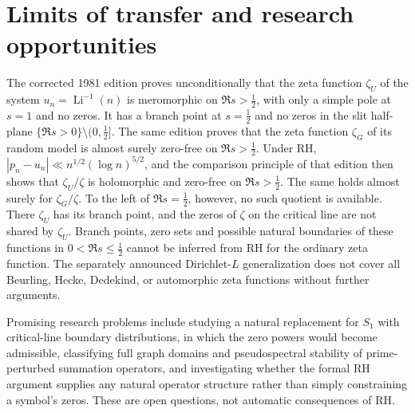 \documentclass[12pt,letterpaper]{article}
\numberwithin{equation}{section}
\theoremstyle{definition}
\begin{document}
\section{Limits of transfer and research opportunities}
The corrected 1981 edition proves unconditionally that the zeta function
$\zeta_U$ of the system $u_n=\operatorname{Li}^{-1}(n)$ is meromorphic on
$\Re s>\tfrac12$, with only a simple pole at $s=1$ and no zeros.  It has a
branch point at $s=\tfrac12$ and no zeros in the slit half-plane
$\{\Re s>0\}\setminus(0,\tfrac12]$.  The same edition proves that the zeta
function $\zeta_G$ of its random model is almost surely zero-free on
$\Re s>\tfrac12$.  Under RH, $|p_n-u_n|\ll n^{1/2}(\log n)^{5/2}$, and the
comparison principle of that edition then shows that $\zeta_U/\zeta$ is
holomorphic and zero-free on $\Re s>\tfrac12$.  The same holds almost
surely for $\zeta_G/\zeta$.  To the left of $\Re s=\tfrac12$, however, no
such quotient is available.  There $\zeta_U$ has its branch point, and
the zeros of $\zeta$ on the critical line are not shared by $\zeta_U$.
Branch points, zero sets and possible natural boundaries of these
functions in $0<\Re s\le\tfrac12$ cannot be inferred from RH for the
ordinary zeta function.
The separately announced Dirichlet-$L$ generalization
does not cover all Beurling, Hecke, Dedekind, or
automorphic zeta functions without further arguments.

Promising research problems include studying a natural replacement
for $S_1$ with critical-line boundary distributions, in which the zero
powers would become admissible,
classifying full graph domains and pseudospectral stability
of prime-perturbed summation operators, and investigating
whether the formal RH argument supplies any natural operator
structure rather than simply constraining a symbol's zeros.
These are open questions, not automatic consequences of RH.
\end{document}
